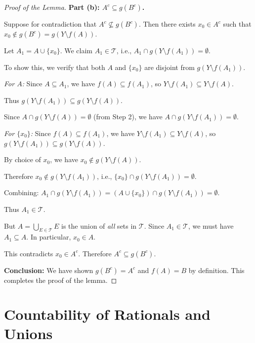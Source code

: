 \documentclass[11pt]{report}
\begin{document}
\begin{proof}[Proof of the Lemma]
\textbf{Part (b): $A^c \subseteq g(B^c)$.}

Suppose for contradiction that $A^c \not\subseteq g(B^c)$. Then there exists $x_0 \in A^c$ such that $x_0 \notin g(B^c) = g(Y \setminus f(A))$.

Let $A_1 = A \cup \{x_0\}$. We claim $A_1 \in \mathcal{T}$, i.e., $A_1 \cap g(Y \setminus f(A_1)) = \emptyset$.

To show this, we verify that both $A$ and $\{x_0\}$ are disjoint from $g(Y \setminus f(A_1))$.

\textit{For $A$:} Since $A \subseteq A_1$, we have $f(A) \subseteq f(A_1)$, so $Y \setminus f(A_1) \subseteq Y \setminus f(A)$.

Thus $g(Y \setminus f(A_1)) \subseteq g(Y \setminus f(A))$.

Since $A \cap g(Y \setminus f(A)) = \emptyset$ (from Step 2), we have $A \cap g(Y \setminus f(A_1)) = \emptyset$.

\textit{For $\{x_0\}$:} Since $f(A) \subseteq f(A_1)$, we have $Y \setminus f(A_1) \subseteq Y \setminus f(A)$, so $g(Y \setminus f(A_1)) \subseteq g(Y \setminus f(A))$.

By choice of $x_0$, we have $x_0 \notin g(Y \setminus f(A))$.

Therefore $x_0 \notin g(Y \setminus f(A_1))$, i.e., $\{x_0\} \cap g(Y \setminus f(A_1)) = \emptyset$.

Combining: $A_1 \cap g(Y \setminus f(A_1)) = (A \cup \{x_0\}) \cap g(Y \setminus f(A_1)) = \emptyset$.

Thus $A_1 \in \mathcal{T}$.

But $A = \bigcup_{E \in \mathcal{T}} E$ is the union of \emph{all} sets in $\mathcal{T}$. Since $A_1 \in \mathcal{T}$, we must have $A_1 \subseteq A$. In particular, $x_0 \in A$.

This contradicts $x_0 \in A^c$. Therefore $A^c \subseteq g(B^c)$.

\textbf{Conclusion:} We have shown $g(B^c) = A^c$ and $f(A) = B$ by definition. This completes the proof of the lemma.
\end{proof}

\section{Countability of Rationals and Unions}
\end{document}
